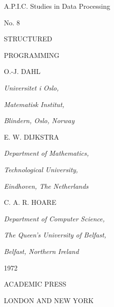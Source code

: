 \frontmatter
\pagestyle{empty}

\begin{center}
\large
A.P.I.C. Studies in Data Processing

No. 8
\vspace{4em}

{
	\Huge
	STRUCTURED
	\smallskip
	
	PROGRAMMING
}
\vfill

O.-J. DAHL

\emph{Universitet i Oslo,}

\emph{Matematisk Institut,}

\emph{Blindern, Oslo, Norway}
\vspace{2em}

E. W. DIJKSTRA

\emph{Department of Mathematics,}

\emph{Technological University,}

\emph{Eindhoven, The Netherlands}
\vspace{2em}

C. A. R. HOARE

\emph{Department of Computer Science,}

\emph{The Queen's University of Belfast,}

\emph{Belfast, Northern Ireland}


\vfill
1972

ACADEMIC PRESS

LONDON AND NEW YORK
\end{center}